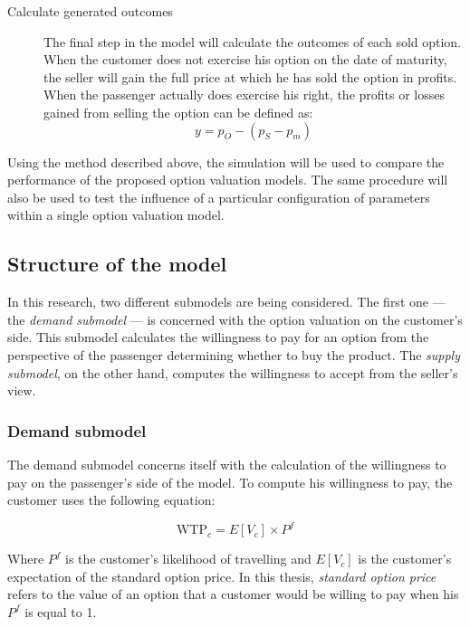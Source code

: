 \begin{description}

\item[Calculate generated outcomes] The final step in the model will calculate the outcomes of each sold option. When the customer does not exercise his option on the date of maturity, the seller will gain the full price at which he has sold the option in profits. When the passenger actually does exercise his right, the profits or losses gained from selling the option can be defined as:
$$ y = p_O - (p_S - p_m) $$
\end{description}

Using the method described above, the simulation will be used to compare the performance of the proposed option valuation models. The same procedure will also be used to test the influence of a particular configuration of parameters within a single option valuation model.




\subsection{Structure of the model}
In this research, two different submodels are being considered. The first one --- the \emph{demand submodel} --- is concerned with the option valuation on the customer's side. This submodel calculates the willingness to pay for an option from the perspective of the passenger determining whether to buy the product. The \emph{supply submodel}, on the other hand, computes the willingness to accept from the seller's view.

\subsubsection{Demand submodel}
The demand submodel concerns itself with the calculation of the willingness to pay on the passenger's side of the model. To compute his willingness to pay, the customer uses the following equation:

$$ \mbox{WTP}_c = E[V_c] \times P^f $$

Where $P^f$ is the customer's likelihood of travelling and $E[V_c]$ is the customer's expectation of the standard option price. In this thesis, \emph{standard option price} refers to the value of an option that a customer would be willing to pay when his $P^f$ is equal to 1.

